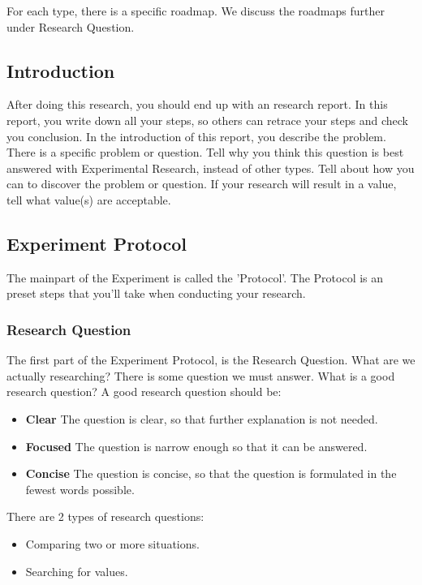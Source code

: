 \documentclass[10pt]{report}
\begin{document}
\noindent For each type, there is a specific roadmap. We discuss the roadmaps further under Research Question.

\subsection{Introduction}

After doing this research, you should end up with an research report. In this report, you write down all your steps, so others can retrace your steps and check you conclusion. In the introduction of this report, you describe the problem. There is a specific problem or question. Tell why you think this question is best answered with Experimental Research, instead of other types. Tell about how you can to discover the problem or question. If your research will result in a value, tell what value(s) are acceptable.

\subsection{Experiment Protocol}

The mainpart of the Experiment is called the 'Protocol'. The Protocol is an preset steps that you'll take when conducting your research.

\subsubsection{Research Question}

The first part of the Experiment Protocol, is the Research Question. What are we actually researching? There is some question we must answer. What is a good research question? A good research question should be:

\begin{itemize}
	\item \textbf{Clear} The question is clear, so that further explanation is not needed.
	\item \textbf{Focused} The question is narrow enough so that it can be answered.
	\item \textbf{Concise} The question is concise, so that the question is formulated in the fewest words possible.
\end{itemize}

\noindent There are 2 types of research questions:

\begin{itemize}
	\item Comparing two or more situations.
	\item Searching for values.
\end{itemize}
\end{document}
